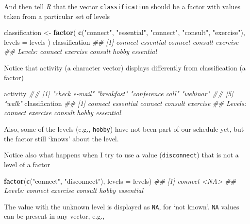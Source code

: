 \documentclass[
]{book}
\newenvironment{Shaded}{\begin{snugshade}}{\end{snugshade}}
\newcommand{\CommentTok}[1]{\textcolor[rgb]{0.56,0.35,0.01}{\textit{#1}}}
\newcommand{\DataTypeTok}[1]{\textcolor[rgb]{0.13,0.29,0.53}{#1}}
\newcommand{\KeywordTok}[1]{\textcolor[rgb]{0.13,0.29,0.53}{\textbf{#1}}}
\newcommand{\NormalTok}[1]{#1}
\newcommand{\StringTok}[1]{\textcolor[rgb]{0.31,0.60,0.02}{#1}}
\begin{document}
And then tell \emph{R} that the vector \texttt{classification} should be a factor with values taken from a particular set of levels

\begin{Shaded}
\begin{Highlighting}[]
\NormalTok{classification <-}\StringTok{ }\KeywordTok{factor}\NormalTok{(}
    \KeywordTok{c}\NormalTok{(}\StringTok{"connect"}\NormalTok{, }\StringTok{"essential"}\NormalTok{, }\StringTok{"connect"}\NormalTok{, }\StringTok{"consult"}\NormalTok{, }\StringTok{"exercise"}\NormalTok{),}
    \DataTypeTok{levels =}\NormalTok{ levels}
\NormalTok{)}
\NormalTok{classification}
\CommentTok{## [1] connect   essential connect   consult   exercise }
\CommentTok{## Levels: connect exercise consult hobby essential}
\end{Highlighting}
\end{Shaded}

Notice that activity (a character vector) displays differently from classification (a factor)

\begin{Shaded}
\begin{Highlighting}[]
\NormalTok{activity}
\CommentTok{## [1] "check e-mail"    "breakfast"       "conference call" "webinar"        }
\CommentTok{## [5] "walk"}
\NormalTok{classification}
\CommentTok{## [1] connect   essential connect   consult   exercise }
\CommentTok{## Levels: connect exercise consult hobby essential}
\end{Highlighting}
\end{Shaded}

Also, some of the levels (e.g., \texttt{hobby}) have not been part of our schedule yet, but the factor still `knows' about the level.

Notice also what happens when I try to use a value (\texttt{disconnect}) that is not a level of a factor

\begin{Shaded}
\begin{Highlighting}[]
\KeywordTok{factor}\NormalTok{(}\KeywordTok{c}\NormalTok{(}\StringTok{"connect"}\NormalTok{, }\StringTok{"disconnect"}\NormalTok{), }\DataTypeTok{levels =}\NormalTok{ levels)}
\CommentTok{## [1] connect <NA>   }
\CommentTok{## Levels: connect exercise consult hobby essential}
\end{Highlighting}
\end{Shaded}

The value with the unknown level is displayed as \texttt{NA}, for `not known'. \texttt{NA} values can be present in any vector, e.g.,
\end{document}
